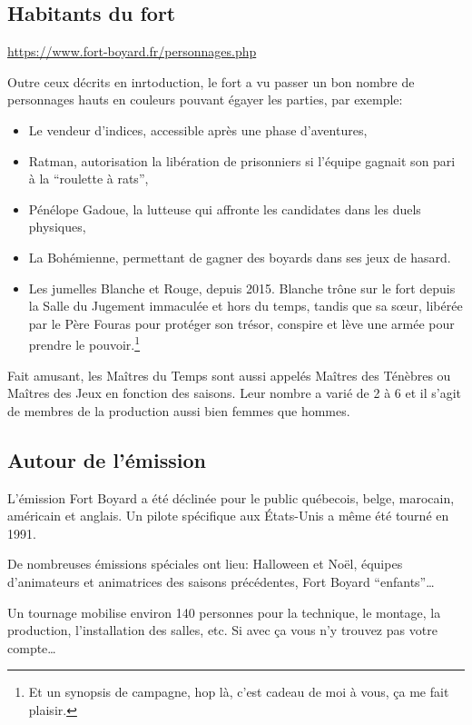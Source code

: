 \documentclass[french,twocolumn,twoside]{article}
\begin{document}
\subsection*{Habitants du fort}

\url{https://www.fort-boyard.fr/personnages.php}

Outre ceux décrits en inrtoduction, le fort a vu passer un bon nombre de personnages hauts en couleurs pouvant égayer les parties, par exemple:
\begin{itemize}
	\item[\ding{71}] Le vendeur d'indices, accessible après une phase d'aventures,
	\item[\ding{71}] Ratman, autorisation la libération de prisonniers si l'équipe gagnait son pari à la ``roulette à rats'',
	\item[\ding{71}] Pénélope Gadoue, la lutteuse qui affronte les candidates dans les duels physiques,
	\item[\ding{71}] La Bohémienne, permettant de gagner des boyards dans ses jeux de hasard.
	\item[\ding{71}] Les jumelles Blanche et Rouge, depuis 2015. Blanche trône sur le fort depuis la Salle du Jugement immaculée et hors du temps, tandis que sa s\oe{}ur, libérée par le Père Fouras pour protéger son trésor, conspire et lève une armée pour prendre le pouvoir.\footnote{Et un synopsis de campagne, hop là, c'est cadeau de moi à vous, ça me fait plaisir.}
\end{itemize}

Fait amusant, les Maîtres du Temps sont aussi appelés Maîtres des Ténèbres ou Maîtres des Jeux en fonction des saisons. Leur nombre a varié de 2 à 6 et il s'agit de membres de la production aussi bien femmes que hommes.

\subsection*{Autour de l'émission}

L'émission Fort Boyard a été déclinée pour le public québecois, belge, marocain, américain et anglais. Un pilote spécifique aux États-Unis a même été tourné en 1991.

De nombreuses émissions spéciales ont lieu: Halloween et Noël, équipes d'animateurs et animatrices des saisons précédentes, Fort Boyard ``enfants''\dots

Un tournage mobilise environ 140 personnes pour la technique, le montage, la production, l'installation des salles, etc. Si avec ça vous n'y trouvez pas votre compte\dots
\end{document}
